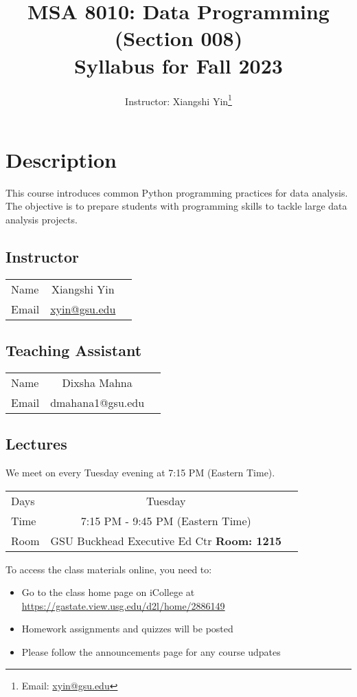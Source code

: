 \documentclass{article}
\title{
	MSA 8010: Data Programming (Section 008)\\
	\large Syllabus for Fall 2023
}
\author{Instructor: Xiangshi Yin\thanks{Email: \href{mailto:xyin@gsu.edu}{xyin@gsu.edu}}}
\begin{document}
\maketitle

\tableofcontents


\section{Description}
This course introduces common Python programming practices for data analysis. The objective is to prepare students with programming skills to tackle large data analysis projects.


\subsection{Instructor}
\begin{center}
  \begin{tabular}{ l | c r }
    \hline			
    Name & Xiangshi Yin\\
    Email & \href{mailto:xyin@gsu.edu}{xyin@gsu.edu}\\
    \hline  
  \end{tabular}
\end{center}

\subsection{Teaching Assistant}
\begin{center}
	\begin{tabular}{ l | c r }
		\hline			
		Name & Dixsha Mahna\\
		Email & dmahana1@gsu.edu\\
		\hline  
	\end{tabular}
\end{center}

\subsection{Lectures}
We meet on every Tuesday evening at 7:15 PM (Eastern Time).
\begin{center}
  \begin{tabular}{ l | c r }
    \hline			
    Days & Tuesday\\
   Time & 7:15 PM - 9:45 PM (Eastern Time) \\
    Room & GSU Buckhead Executive Ed Ctr \textbf{Room: 1215}\\
    \hline  
  \end{tabular}
\end{center}
\begin{flushleft}
To access the class materials online, you need to:
\begin{itemize}
  \item Go to the class home page on iCollege at \url{https://gastate.view.usg.edu/d2l/home/2886149}
  \item Homework assignments and quizzes will be posted
  \item Please follow the announcements page for any course udpates
\end{itemize}
\end{flushleft}
\end{document}
